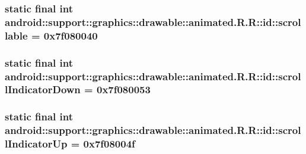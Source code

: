 \hypertarget{classandroid_1_1support_1_1graphics_1_1drawable_1_1animated_1_1_r_1_1id_5e96383f3794820387df2ae182bea221}{
\subsubsection[{scrollable}]{\setlength{\rightskip}{0pt plus 5cm}static final int android::support::graphics::drawable::animated.R.R::id::scrollable = 0x7f080040}}
\label{classandroid_1_1support_1_1graphics_1_1drawable_1_1animated_1_1_r_1_1id_5e96383f3794820387df2ae182bea221}


\hypertarget{classandroid_1_1support_1_1graphics_1_1drawable_1_1animated_1_1_r_1_1id_0b10a10fbbf226781332d85fe6af6236}{
\subsubsection[{scrollIndicatorDown}]{\setlength{\rightskip}{0pt plus 5cm}static final int android::support::graphics::drawable::animated.R.R::id::scrollIndicatorDown = 0x7f080053}}
\label{classandroid_1_1support_1_1graphics_1_1drawable_1_1animated_1_1_r_1_1id_0b10a10fbbf226781332d85fe6af6236}


\hypertarget{classandroid_1_1support_1_1graphics_1_1drawable_1_1animated_1_1_r_1_1id_0c537fe8c386d9dee31058e690527582}{
\subsubsection[{scrollIndicatorUp}]{\setlength{\rightskip}{0pt plus 5cm}static final int android::support::graphics::drawable::animated.R.R::id::scrollIndicatorUp = 0x7f08004f}}
\label{classandroid_1_1support_1_1graphics_1_1drawable_1_1animated_1_1_r_1_1id_0c537fe8c386d9dee31058e690527582}


